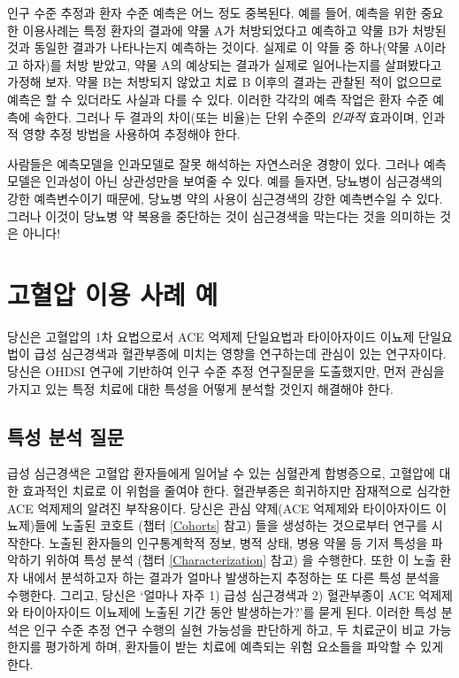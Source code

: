\documentclass[11pt]{book}
\theoremstyle{definition}
\theoremstyle{definition}
\theoremstyle{definition}
\theoremstyle{remark}
\let\BeginKnitrBlock\begin \let\EndKnitrBlock\end
\begin{document}
인구 수준 추정과 환자 수준 예측은 어느 정도 중복된다. 예를 들어, 예측을
위한 중요한 이용사례는 특정 환자의 결과에 약물 A가 처방되었다고 예측하고
약물 B가 처방된 것과 동일한 결과가 나타나는지 예측하는 것이다. 실제로 이
약들 중 하나(약물 A이라고 하자)를 처방 받았고, 약물 A의 예상되는 결과가
실제로 일어나는지를 살펴봤다고 가정해 보자. 약물 B는 처방되지 않았고
치료 B 이후의 결과는 관찰된 적이 없으므로 예측은 할 수 있더라도 사실과
다를 수 있다. 이러한 각각의 예측 작업은 환자 수준 예측에 속한다. 그러나
두 결과의 차이(또는 비율)는 단위 수준의 \emph{인과적} 효과이며, 인과적
영향 추정 방법을 사용하여 추정해야 한다.

\BeginKnitrBlock{rmdimportant}
사람들은 예측모델을 인과모델로 잘못 해석하는 자연스러운 경향이 있다.
그러나 예측 모델은 인과성이 아닌 상관성만을 보여줄 수 있다. 예를 들자면,
당뇨병이 심근경색의 강한 예측변수이기 때문에, 당뇨병 약의 사용이
심근경색의 강한 예측변수일 수 있다. 그러나 이것이 당뇨병 약 복용을
중단하는 것이 심근경색을 막는다는 것을 의미하는 것은 아니다!
\EndKnitrBlock{rmdimportant}

\section{고혈압 이용 사례 예}\label{---}

당신은 고혈압의 1차 요법으로서 ACE 억제제 단일요법과 타이아자이드 이뇨제
단일요법이 급성 심근경색과 혈관부종에 미치는 영향을 연구하는데 관심이
있는 연구자이다. 당신은 OHDSI 연구에 기반하여 인구 수준 추정 연구질문을
도출했지만, 먼저 관심을 가지고 있는 특정 치료에 대한 특성을 어떻게
분석할 것인지 해결해야 한다.

\subsection{특성 분석 질문}\label{--}

급성 심근경색은 고혈압 환자들에게 일어날 수 있는 심혈관계 합병증으로,
고혈압에 대한 효과적인 치료로 이 위험을 줄여야 한다. 혈관부종은
희귀하지만 잠재적으로 심각한 ACE 억제제의 알려진 부작용이다. 당신은 관심
약제(ACE 억제제와 타이아자이드 이뇨제)들에 노출된 코호트 (챕터
\ref{Cohorts} 참고) 들을 생성하는 것으로부터 연구를 시작한다. 노출된
환자들의 인구통계학적 정보, 병적 상태, 병용 약물 등 기저 특성을 파악하기
위하여 특성 분석 (챕터 \ref{Characterization} 참고) 을 수행한다. 또한 이
노출 환자 내에서 분석하고자 하는 결과가 얼마나 발생하는지 추정하는 또
다른 특성 분석을 수행한다. 그리고, 당신은 `얼마나 자주 1) 급성
심근경색과 2) 혈관부종이 ACE 억제제와 타이아자이드 이뇨제에 노출된 기간
동안 발생하는가?'를 묻게 된다. 이러한 특성 분석은 인구 수준 추정 연구
수행의 실현 가능성을 판단하게 하고, 두 치료군이 비교 가능한지를 평가하게
하며, 환자들이 받는 치료에 예측되는 위험 요소들을 파악할 수 있게 한다.
\end{document}
